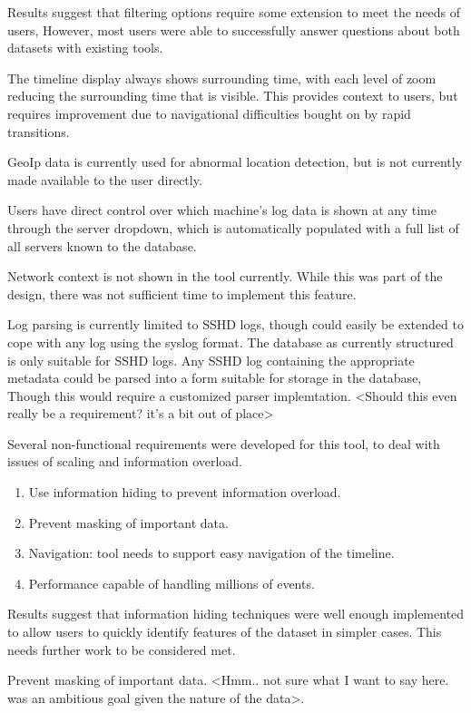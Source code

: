 Results suggest that filtering options require some extension to meet the needs of users, However, most users were able to successfully answer questions about both datasets with existing tools.

The timeline display always shows surrounding time, with each level of zoom reducing the surrounding time that is visible. This provides context to users, but requires improvement due to navigational difficulties bought on by rapid transitions.

GeoIp data is currently used for abnormal location detection, but is not currently made available to the user directly.

Users have direct control over which machine's log data is shown at any time through the server dropdown, which is automatically populated with a full list of all servers known to the database. 

Network context is not shown in the tool currently. While this was part of the design, there was not sufficient time to implement this feature.

Log parsing is currently limited to SSHD logs, though could easily be extended to cope with any log using the syslog format. The database as currently structured is only suitable for SSHD logs. Any SSHD log containing the appropriate metadata could be parsed into a form suitable for storage in the database, Though this would require a customized parser implemtation. <Should this even really be a requirement? it's a bit out of place> 

Several non-functional requirements were developed for this tool, to deal with issues of scaling and information overload.

\begin{enumerate}
\item{Use information hiding to prevent information overload.}
\item{Prevent masking of important data.}
\item{Navigation: tool needs to support easy navigation of the timeline.}
\item{Performance capable of handling millions of events.}
\end{enumerate}

Results suggest that information hiding techniques were well enough implemented to allow users to quickly identify features of the dataset in simpler cases. This needs further work to be considered met.

Prevent masking of important data. <Hmm.. not sure what I want to say here. was an ambitious goal given the nature of the data>.

